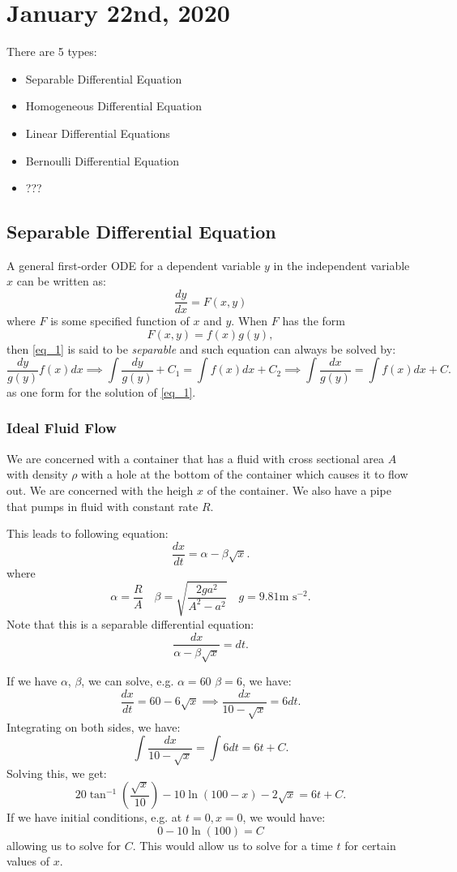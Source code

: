 \documentclass[../main/main.tex]{subfiles}
\begin{document}
\section{January 22nd, 2020}
There are 5 types: 
\begin{itemize}
	\item Separable Differential Equation
	\item Homogeneous Differential Equation
	\item Linear Differential Equations
	\item Bernoulli Differential Equation
	\item ???
\end{itemize}
\subsection{Separable Differential Equation}
A general first-order ODE for a dependent variable $y$ in the independent variable  $x$ can be written as:  
\begin{equation}
	\frac{dy}{dx}=F(x,y)
	\label{eq_1}
\end{equation} where $F$ is some specified function of  $x$ and  $y$. When  $F$ has the form
\begin{equation}
	F(x,y)=f(x)g(y),
\end{equation} then \ref{eq_1} is said to be \textit{separable} and such equation can always be solved by: \[
	\frac{dy}{g(y)} f(x)dx \implies \int\frac{dy}{g(y)}+C_1=\int f(x)dx+C_2 \implies \int \frac{dx}{g(y)} = \int f(x)dx+C
.\] as one form for the solution of \ref{eq_1}.
\subsubsection{Ideal Fluid Flow}
We are concerned with a container that has a fluid with cross sectional area $A$ with density  $\rho$ with a hole at the bottom of the container which causes it to flow out. We are concerned with the heigh  $x$ of the container. We also have a pipe that pumps in fluid with constant rate  $R$. 

This leads to following equation: \[
	\frac{dx}{dt} = \alpha-\beta\sqrt{x} 
.\]  where \[
\alpha = \frac{R}{A} \quad \beta = \sqrt{\frac{2ga^2}{A^2-a^2}} \quad g=9.81\text{m s}^{-2}
.\] Note that this is a separable differential equation: \[
\frac{dx}{\alpha-\beta\sqrt{x} } = dt
.\] 

If we have $\alpha$,  $\beta$, we can solve, e.g.  $\alpha=60$  $\beta=6$, we have:  \[
	\frac{dx}{dt} = 60-6\sqrt{x} \implies \frac{dx}{10-\sqrt{x} } = 6 dt
.\] Integrating on both sides, we have: \[
\int \frac{dx}{10-\sqrt{x} } = \int 6 dt = 6t+C
.\]  Solving this, we get: \[
20 \tan^{-1}\left( \frac{\sqrt{x}}{10}\right) -10\ln(100-x)-2\sqrt{x}=6t+C
.\] If we have initial conditions, e.g. at $t=0,x=0$, we would have:  \[
0-10\ln(100)=C
\] allowing us to solve for $C$. This would allow us to solve for a time $t$ for certain values of  $x$.
\end{document}
